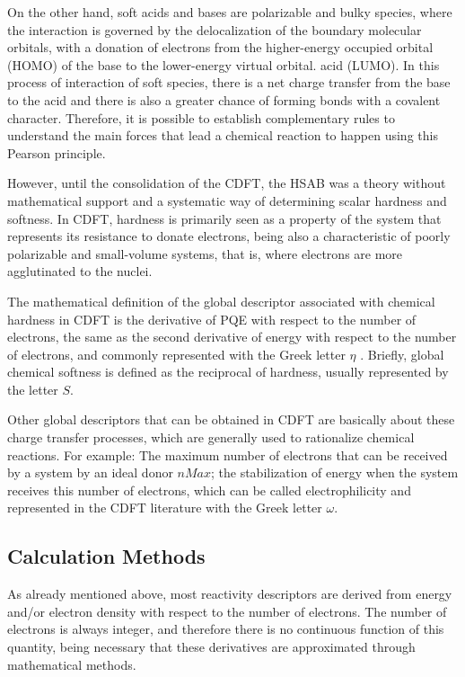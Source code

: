 \documentclass[a4paper,11pt]{refart}
\begin{document}
	On the other hand, soft acids and bases are polarizable and bulky species, where the interaction is governed by the delocalization of the boundary molecular orbitals, with a donation of electrons from the higher-energy occupied orbital (HOMO) of the base to the lower-energy virtual orbital. acid (LUMO). In this process of interaction of soft species, there is a net charge transfer from the base to the acid and there is also a greater chance of forming bonds with a covalent character. Therefore, it is possible to establish complementary rules to understand the main forces that lead a chemical reaction to happen using this Pearson principle.

	However, until the consolidation of the CDFT, the HSAB was a theory without mathematical support and a systematic way of determining scalar hardness and softness. In CDFT, hardness is primarily seen as a property of the system that represents its resistance to donate electrons, being also a characteristic of poorly polarizable and small-volume systems, that is, where electrons are more agglutinated to the nuclei.

	The mathematical definition of the global descriptor associated with chemical hardness in CDFT is the derivative of PQE with respect to the number of electrons, the same as the second derivative of energy with respect to the number of electrons, and commonly represented with the Greek letter $\eta$ . Briefly, global chemical softness is defined as the reciprocal of hardness, usually represented by the letter $S$.

	Other global descriptors that can be obtained in CDFT are basically about these charge transfer processes, which are generally used to rationalize chemical reactions. For example: The maximum number of electrons that can be received by a system by an ideal donor $nMax$; the stabilization of energy when the system receives this number of electrons, which can be called electrophilicity and represented in the CDFT literature with the Greek letter $\omega$\cite{Pearson1990}.

	\subsection{Calculation Methods}

	As already mentioned above, most reactivity descriptors are derived from energy and/or electron density with respect to the number of electrons. The number of electrons is always integer, and therefore there is no continuous function of this quantity, being necessary that these derivatives are approximated through mathematical methods.
\end{document}
